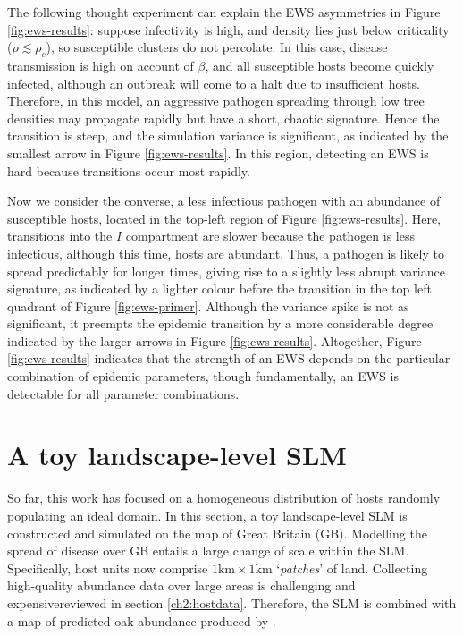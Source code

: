 The following thought experiment can explain the EWS asymmetries in Figure \ref{fig:ews-results}: %
suppose infectivity is high, and density lies just below criticality ($\rho\lesssim\rho_c$), 
so susceptible clusters do not percolate. 
In this case, disease transmission is high on account of $\beta$, 
and all susceptible hosts become quickly infected, 
although an outbreak will come to a halt due to insufficient hosts. Therefore, in this model, 
an aggressive pathogen spreading through low tree densities may propagate rapidly but have a short, 
chaotic signature. Hence the transition is steep,
and the simulation variance is significant, as indicated by the smallest arrow in Figure \ref{fig:ews-results}. 
In this region, detecting an EWS is hard because transitions occur most rapidly.

Now we consider the converse, a less infectious pathogen with an abundance of susceptible hosts, 
located in the top-left region of Figure \ref{fig:ews-results}.
Here, transitions into the $I$ compartment are slower because the pathogen is less infectious, 
although this time, hosts are abundant.
Thus, a pathogen is likely to spread predictably for longer times, 
giving rise to a slightly less abrupt variance signature, 
as indicated by a lighter colour before the transition in the top left quadrant of Figure \ref{fig:ews-primer}.
Although the variance spike is not as significant, 
it preempts the epidemic transition by a more considerable degree\textemdash
indicated by the larger arrows in Figure \ref{fig:ews-results}.
Altogether, Figure \ref{fig:ews-results} indicates that the strength of an EWS depends on the particular combination of epidemic parameters, 
though fundamentally, an EWS is detectable for all parameter combinations.

\newpage

\section{A toy landscape-level SLM}

So far, this work has focused on a homogeneous distribution of hosts randomly populating an ideal domain. 
In this section, a toy landscape-level SLM is constructed and simulated on the map of Great Britain (GB).
Modelling the spread of disease over GB entails a large change of scale within the SLM. 
Specifically, host units now comprise $\mathrm{1km \times 1km}$ `\textit{patches}' of land. 
Collecting high-quality abundance data over large areas is challenging and expensive\textemdash reviewed in section \ref{ch2:hostdata}.
Therefore, the SLM is combined with a map of predicted oak abundance produced by \cite{hill.data}.

